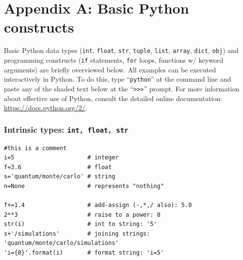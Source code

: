 





\section{Appendix A: Basic Python constructs\label{app:python_basics}}
Basic Python data types (\texttt{int}, \texttt{float}, \texttt{str}, \texttt{tuple}, \texttt{list}, \texttt{array}, \texttt{dict}, \texttt{obj}) and programming constructs (\texttt{if} statements, \texttt{for} loops, functions w/ keyword arguments) are briefly overviewed below.  All examples can be executed interactively in Python.  To do this, type ``\texttt{python}'' at the command line and paste any of the shaded text below at the ``\texttt{>>>}'' prompt.  For more information about effective use of Python, consult the detailed online documentation: \href{https://docs.python.org/2/}{https://docs.python.org/2/}.

\subsubsection{Intrinsic types: \texttt{int, float, str}}
\begin{shaded}
\begin{verbatim}
#this is a comment
i=5                     # integer
f=3.6                   # float
s='quantum/monte/carlo' # string
n=None                  # represents "nothing"

f+=1.4                  # add-assign (-,*,/ also): 5.0
2**3                    # raise to a power: 8
str(i)                  # int to string: '5'
s+'/simulations'        # joining strings: 'quantum/monte/carlo/simulations'
'i={0}'.format(i)       # format string: 'i=5'

\end{verbatim}
\end{shaded}

 
